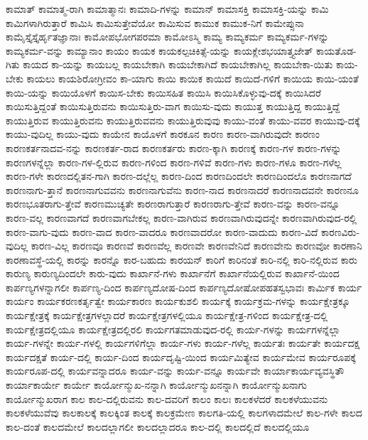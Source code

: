 {ಕಾಮಾತ್
ಕಾಮಾತ್ಮ-ರಾಗಿ
ಕಾಮಾತ್ಮಾನಃ
ಕಾಮಾದಿ-ಗಳನ್ನು
ಕಾಮಾನ್
ಕಾಮಾಸಕ್ತಿ
ಕಾಮಾಸಕ್ತಿ-ಯನ್ನು
ಕಾಮಿ
ಕಾಮಿಗಳಾಗಿರುತ್ತಾರೆ
ಕಾಮಿಸಿ
ಕಾಮಿಸುತ್ತೇವೆಯೋ
ಕಾಮಿಸುವ
ಕಾಮುಕ
ಕಾಮುಕ-ನಿಗೆ
ಕಾಮೇಪ್ಸುನಾ
ಕಾಮೈಸ್ತೈಸ್ತೈರ್ಹೃತಜ್ಞಾನಾಃ
ಕಾಮೋಪಭೋಗಪರಮಾ
ಕಾಮೋಽಸ್ಮಿ
ಕಾಮ್ಯ
ಕಾಮ್ಯಕರ್ಮ
ಕಾಮ್ಯಕರ್ಮ-ಗಳನ್ನು
ಕಾಮ್ಯಕರ್ಮ-ವನ್ನು
ಕಾಮ್ಯಾನಾಂ
ಕಾಯಂ
ಕಾಯಕ
ಕಾಯಕಲ್ಪಚಿಕಿತ್ಸೆ-ಯನ್ನು
ಕಾಯಕ್ಲೇಶಭಯಾತ್ತ್ಯಜೇತ್
ಕಾಯತೊಡ-ಗಿತು
ಕಾಯದ
ಕಾ-ಯನ್ನು
ಕಾಯಬಲ್ಲ
ಕಾಯಬೇಕಾಗಿ
ಕಾಯಬೇಕಾಗಿದೆ
ಕಾಯಬೇಕಾಗಿಲ್ಲ
ಕಾಯಬೇಕಾ-ಯಿತು
ಕಾಯ-ಬೇಕು
ಕಾಯಲು
ಕಾಯಶಿರೋಗ್ರೀವಂ
ಕಾ-ಯಾಗು
ಕಾಯಿ
ಕಾಯಿಕ
ಕಾಯಿದೆ
ಕಾಯಿದೆ-ಗಳಿಗೆ
ಕಾಯಿಯ
ಕಾಯಿ-ಯಂತೆ
ಕಾಯಿ-ಯನ್ನು
ಕಾಯಿಯೊಳಗೆ
ಕಾಯಿಸ-ಬೇಕು
ಕಾಯಿಸಹಿತ
ಕಾಯಿಸಿ
ಕಾಯಿಸಿಕೊಳ್ಳುವು-ದಕ್ಕೆ
ಕಾಯಿಸಿದರೆ
ಕಾಯಿಸುತ್ತಿದ್ದಂತೆ
ಕಾಯಿಸುತ್ತಿರುವನು
ಕಾಯಿಸುತ್ತಿರು-ವಾಗ
ಕಾಯಿಸು-ವುದು
ಕಾಯುತ್ತ
ಕಾಯುತ್ತಿದ್ದ
ಕಾಯುತ್ತಿದ್ದೆ
ಕಾಯುತ್ತಿರುವ
ಕಾಯುತ್ತಿರುವನು
ಕಾಯುತ್ತಿರುವವನು
ಕಾಯುತ್ತಿರುವುವು
ಕಾಯು-ವಂತೆ
ಕಾಯು-ವವರ
ಕಾಯುವು-ದಕ್ಕೆ
ಕಾಯು-ವುದಿಲ್ಲ
ಕಾಯು-ವುದು
ಕಾಯೇನ
ಕಾಯೊಳಗೆ
ಕಾರಕೂನ
ಕಾರಣ
ಕಾರಣ-ವಾಗಿರುವುದೇ
ಕಾರಣಂ
ಕಾರಣಕರ್ತನಾದವ-ನನ್ನು
ಕಾರಣಕರ್ತ-ರಾದ
ಕಾರಣಕರ್ತರು
ಕಾರಣ-ಕ್ಕಾಗಿ
ಕಾರಣಕ್ಕೆ
ಕಾರಣ-ಗಳ
ಕಾರಣ-ಗಳನ್ನು
ಕಾರಣಗಳನ್ನೆಲ್ಲಾ
ಕಾರಣ-ಗಳ-ಲ್ಲಿರುವ
ಕಾರಣ-ಗಳಿಂದ
ಕಾರಣ-ಗಳಿವೆ
ಕಾರಣ-ಗಳು
ಕಾರಣ-ಗಳೂ
ಕಾರಣ-ಗಳೆಲ್ಲ
ಕಾರಣ-ಗಳೇ
ಕಾರಣದಲ್ಲಿತನ-ಗಾಗಿ
ಕಾರಣ-ದಲ್ಲೆಲ್ಲ
ಕಾರಣ-ದಿಂದ
ಕಾರಣದಿಂದಲೇ
ಕಾರಣದಿಂದಲೊ
ಕಾರಣನಾಗದೆ
ಕಾರಣನಾಗು-ತ್ತಾನೆ
ಕಾರಣನಾಗುವವನು
ಕಾರಣನಾಗುವೆನು
ಕಾರಣ-ನಾದ
ಕಾರಣನಾದರೆ
ಕಾರಣನಾದವನೇ
ಕಾರಣನೂ
ಕಾರಣಭೂತರಾಗು-ತ್ತೇವೆ
ಕಾರಣಮುಚ್ಯತೇ
ಕಾರಣರಾಗುತ್ತಾರೆ
ಕಾರಣರಾಗು-ತ್ತೇವೆ
ಕಾರಣ-ವನ್ನು
ಕಾರಣ-ವನ್ನೂ
ಕಾರಣ-ವಲ್ಲ
ಕಾರಣವಾಗದೆ
ಕಾರಣವಾಗಬೇಕಲ್ಲ
ಕಾರಣ-ವಾಗಿರುವ
ಕಾರಣವಾಗಿರುವುದನ್ನೇ
ಕಾರಣವಾಗಿರುವುದ-ರಲ್ಲಿ
ಕಾರಣ-ವಾಗು-ವುದು
ಕಾರಣ-ವಾದ
ಕಾರಣ-ವಾದರೂ
ಕಾರಣವಾದರೋ
ಕಾರಣ-ವಾದುದು
ಕಾರಣ-ವಿದೆ
ಕಾರಣವಿರು-ವುದಿಲ್ಲ
ಕಾರಣ-ವಿಲ್ಲ
ಕಾರಣವೂ
ಕಾರಣವೆ
ಕಾರಣವೆಲ್ಲ
ಕಾರಣವೇ
ಕಾರಣವೇನಿದೆ
ಕಾರಣವೇನು
ಕಾರಣವೋ
ಕಾರಣಾನಿ
ಕಾರಣಾವಸ್ಥೆ-ಯಲ್ಲಿ
ಕಾರನ್ನು
ಕಾರನ್ನೊ
ಕಾರ-ಬಹುದು
ಕಾರಯನ್
ಕಾರಿಗೆ
ಕಾರಿನಂತೆ
ಕಾರಿ-ನಲ್ಲಿ
ಕಾರಿ-ನಲ್ಲಿರುವ
ಕಾರು
ಕಾರುಣ್ಯ
ಕಾರುಣ್ಯದಿಂದಲೇ
ಕಾರು-ವುದು
ಕಾರ್ಖಾನೆ-ಗಳು
ಕಾರ್ಖಾನೆಗೆ
ಕಾರ್ಖಾನೆಯಲ್ಲಿರುವ
ಕಾರ್ಖಾನೆ-ಯಿಂದ
ಕಾರ್ಪಣ್ಯಗಳನ್ನಾಗಲೀ
ಕಾರ್ಪಣ್ಯ-ದಿಂದ
ಕಾರ್ಪಣ್ಯದೋಷ-ದಿಂದ
ಕಾರ್ಪಣ್ಯದೋಷೋಪಹತಸ್ವಭಾವಃ
ಕಾರ್ಮಿಕ
ಕಾರ್ಯ
ಕಾರ್ಯಂ
ಕಾರ್ಯಕರಣಕರ್ತೃತ್ವೇ
ಕಾರ್ಯಕಾರಣ
ಕಾರ್ಯಕುಶಲಿ
ಕಾರ್ಯಕ್ಕೆ
ಕಾರ್ಯಕ್ರಮ-ಗಳನ್ನು
ಕಾರ್ಯಕ್ಷೇತ್ರಕ್ಕೂ
ಕಾರ್ಯಕ್ಷೇತ್ರಕ್ಕೆ
ಕಾರ್ಯಕ್ಷೇತ್ರಗಳಲ್ಲಾದರೆ
ಕಾರ್ಯಕ್ಷೇತ್ರಗಳಲ್ಲಿಯೂ
ಕಾರ್ಯಕ್ಷೇತ್ರ-ಗಳಿಂದ
ಕಾರ್ಯಕ್ಷೇತ್ರ-ದಲ್ಲಿ
ಕಾರ್ಯಕ್ಷೇತ್ರದಲ್ಲಿಯೂ
ಕಾರ್ಯಕ್ಷೇತ್ರದಲ್ಲಿರಲಿ
ಕಾರ್ಯಗತಮಾಡುವುದ-ರಲ್ಲಿ
ಕಾರ್ಯ-ಗಳನ್ನು
ಕಾರ್ಯಗಳನ್ನೆಲ್ಲಾ
ಕಾರ್ಯ-ಗಳನ್ನೇ
ಕಾರ್ಯ-ಗಳಲ್ಲಿ
ಕಾರ್ಯಗಳಿಗೆಲ್ಲಾ
ಕಾರ್ಯ-ಗಳು
ಕಾರ್ಯ-ಗಳೆಲ್ಲ
ಕಾರ್ಯತಃ
ಕಾರ್ಯತೇ
ಕಾರ್ಯದಕ್ಷ
ಕಾರ್ಯದಕ್ಷತೆ
ಕಾರ್ಯ-ದಲ್ಲಿ
ಕಾರ್ಯ-ದಿಂದ
ಕಾರ್ಯದೃಷ್ಟಿ-ಯಿಂದ
ಕಾರ್ಯಮಿತ್ಯೇವ
ಕಾರ್ಯಮೇವ
ಕಾರ್ಯರೂಪಕ್ಕೆ
ಕಾರ್ಯರೂಪ-ದಲ್ಲಿ
ಕಾರ್ಯವನ್ನಾದರೂ
ಕಾರ್ಯ-ವನ್ನು
ಕಾರ್ಯ-ವನ್ನೂ
ಕಾರ್ಯವೇ
ಕಾರ್ಯಾಕಾರ್ಯವ್ಯವಸ್ಥಿತೌ
ಕಾರ್ಯಾಕಾರ್ಯೇ
ಕಾರ್ಯೇ
ಕಾರ್ಯೋನ್ಮುಖ-ನನ್ನಾಗಿ
ಕಾರ್ಯೋನ್ಮುಖನನ್ನಾಗಿ
ಕಾರ್ಯೋನ್ಮುಖನಾಗು
ಕಾರ್ಯೋನ್ಮುಖರಾಗ
ಕಾಲ
ಕಾಲ-ದಲ್ಲಿರುವನು
ಕಾಲ-ದವರಿಗೆ
ಕಾಲಂ
ಕಾಲಃ
ಕಾಲಕಳೆದರೆ
ಕಾಲಕಳೆಯುವನು
ಕಾಲಕಳೆಯುವೆವು
ಕಾಲಕಾಲಕ್ಕೆ
ಕಾಲಕ್ಕಿಂತ
ಕಾಲಕ್ಕೆ
ಕಾಲಕ್ರಮೇಣ
ಕಾಲಗತಿ-ಯಲ್ಲಿ
ಕಾಲಗಳಾದಮೇಲೆ
ಕಾಲ-ಗಳೇ
ಕಾಲದ
ಕಾಲ-ದಂತೆ
ಕಾಲದಮೇಲೆ
ಕಾಲದಲ್ಲಾಗಲೀ
ಕಾಲದಲ್ಲಾದರೂ
ಕಾಲ-ದಲ್ಲಿ
ಕಾಲದಲ್ಲಿದೆ
ಕಾಲದಲ್ಲಿಯೂ
}

